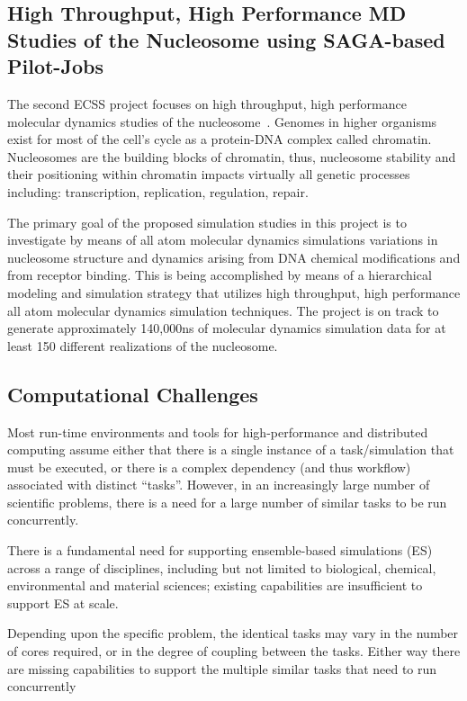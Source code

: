 \documentclass{sig-alternate}
\begin{document}
\subsection{High Throughput, High Performance MD Studies of the Nucleosome
using SAGA-based Pilot-Jobs}
The second ECSS project focuses on high throughput, high performance molecular
dynamics studies of the nucleosome~\cite{TomBishop}. Genomes in higher organisms
exist for most of the cell's cycle as a protein-DNA complex called chromatin.
Nucleosomes are the building blocks of chromatin, thus, nucleosome stability and
their positioning within chromatin impacts virtually all genetic processes
including: transcription, replication, regulation, repair.

The primary goal of the proposed simulation studies in this project is to
investigate by means of all atom molecular dynamics simulations variations in
nucleosome structure and dynamics arising from DNA chemical modifications and
from receptor binding. This is being accomplished by means of a hierarchical
modeling and simulation strategy that utilizes high throughput, high
performance all atom molecular dynamics simulation techniques. The project is
on track to generate approximately 140,000ns of molecular dynamics simulation
data for at least 150 different realizations of the nucleosome.


\subsection{Computational Challenges}

Most run-time environments and tools for high-performance and
distributed computing assume either that there is a single instance of
a task/simulation that must be executed, or there is a complex
dependency (and thus workflow) associated with distinct ``tasks''.
However, in an increasingly large number of scientific problems, there
is a need for a large number of similar tasks to be run concurrently.

There is a fundamental need for supporting ensemble-based simulations
(ES) across a range of disciplines, including but not limited to
biological, chemical, environmental and material sciences; existing
capabilities are insufficient to support ES at scale. 

Depending upon the specific problem, the identical tasks may vary in
the number of cores required, or in the degree of coupling between the
tasks.  Either way there are missing capabilities to support the
multiple similar tasks that need to run concurrently
\end{document}
